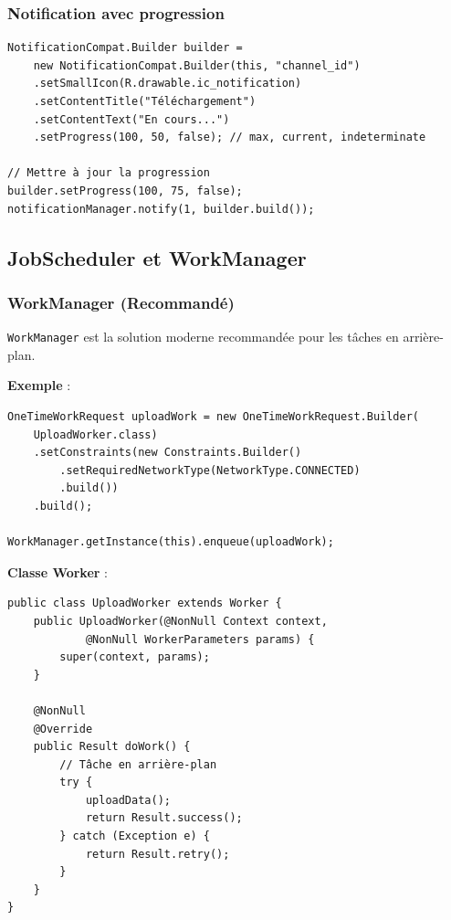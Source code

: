 \documentclass[11pt,a4paper]{article}
\begin{document}
\subsubsection{Notification avec progression}

\begin{lstlisting}
NotificationCompat.Builder builder = 
    new NotificationCompat.Builder(this, "channel_id")
    .setSmallIcon(R.drawable.ic_notification)
    .setContentTitle("Téléchargement")
    .setContentText("En cours...")
    .setProgress(100, 50, false); // max, current, indeterminate

// Mettre à jour la progression
builder.setProgress(100, 75, false);
notificationManager.notify(1, builder.build());
\end{lstlisting}

\subsection{JobScheduler et WorkManager}

\subsubsection{WorkManager (Recommandé)}

\texttt{WorkManager} est la solution moderne recommandée pour les tâches en arrière-plan.

\textbf{Exemple} :
\begin{lstlisting}
OneTimeWorkRequest uploadWork = new OneTimeWorkRequest.Builder(
    UploadWorker.class)
    .setConstraints(new Constraints.Builder()
        .setRequiredNetworkType(NetworkType.CONNECTED)
        .build())
    .build();

WorkManager.getInstance(this).enqueue(uploadWork);
\end{lstlisting}

\textbf{Classe Worker} :
\begin{lstlisting}
public class UploadWorker extends Worker {
    public UploadWorker(@NonNull Context context, 
            @NonNull WorkerParameters params) {
        super(context, params);
    }
    
    @NonNull
    @Override
    public Result doWork() {
        // Tâche en arrière-plan
        try {
            uploadData();
            return Result.success();
        } catch (Exception e) {
            return Result.retry();
        }
    }
}
\end{lstlisting}
\end{document}
